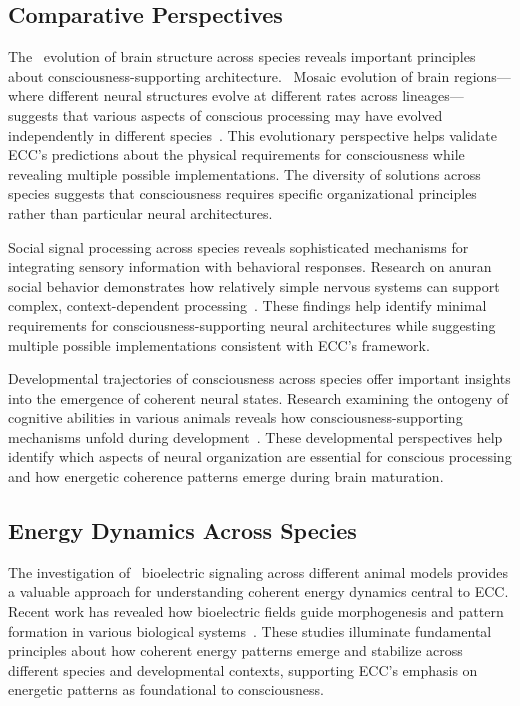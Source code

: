 \subsection*{Comparative Perspectives}

The~ evolution of brain structure across species reveals important principles about consciousness-supporting architecture.~ Mosaic evolution of brain regions—where different neural structures evolve at different rates across lineages—suggests that various aspects of conscious processing may have evolved independently in different species~\cite{Barton2000, Roth2005}. This evolutionary perspective helps validate ECC's predictions about the physical requirements for consciousness while revealing multiple possible implementations. The diversity of solutions across species suggests that consciousness requires specific organizational principles rather than particular neural architectures.

Social signal processing across species reveals sophisticated mechanisms for integrating sensory information with behavioral responses. Research on anuran social behavior demonstrates how relatively simple nervous systems can support complex, context-dependent processing~\cite{Wilczynski2010}. These findings help identify minimal requirements for consciousness-supporting neural architectures while suggesting multiple possible implementations consistent with ECC's framework.

 Developmental trajectories of consciousness across species offer important insights into the emergence of coherent neural states. Research examining the ontogeny of cognitive abilities in various animals reveals how consciousness-supporting mechanisms unfold during development~\cite{DehaeneLambertz2015, Vanderwert2014}. These developmental perspectives help identify which aspects of neural organization are essential for conscious processing and how energetic coherence patterns emerge during brain maturation.

\subsection*{Energy Dynamics Across Species}

The investigation of~ bioelectric signaling across different animal models provides a valuable approach for understanding coherent energy dynamics central to ECC. Recent work has revealed how bioelectric fields guide morphogenesis and pattern formation in various biological systems~\cite{levin2020revisiting, Pietak2017}. These studies illuminate fundamental principles about how coherent energy patterns emerge and stabilize across different species and developmental contexts, supporting ECC's emphasis on energetic patterns as foundational to consciousness.

